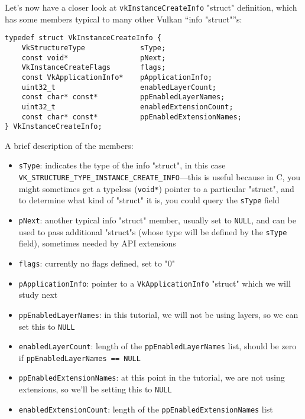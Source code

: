 \documentclass[12pt,letterpaper]{article}
\newcommand{\inquotes}[1]{``#1''}	%
\newcommand{\cil}[1]{\texttt{#1}}
\begin{document}
	Let's now have a closer look at \cil{vkInstanceCreateInfo} "struct" definition, which has some members typical to many other Vulkan \inquotes{info "struct"}s:
		\begin{verbatim}
typedef struct VkInstanceCreateInfo {
	VkStructureType             sType;
	const void*                 pNext;
	VkInstanceCreateFlags       flags;
	const VkApplicationInfo*    pApplicationInfo;
	uint32_t                    enabledLayerCount;
	const char* const*          ppEnabledLayerNames;
	uint32_t                    enabledExtensionCount;
	const char* const*          ppEnabledExtensionNames;
} VkInstanceCreateInfo;
		\end{verbatim}
	A brief description of the members:
		\begin{itemize}
			\item \cil{sType}: indicates the type of the info "struct", in this case \cil{VK_STRUCTURE_TYPE_INSTANCE_CREATE_INFO}---this is useful because in C, you might sometimes get a typeless (\cil{void*}) pointer to a particular "struct", and to determine what kind of "struct" it is, you could query the \cil{sType} field
			
			\item \cil{pNext}: another typical info "struct" member, usually set to \cil{NULL}, and can be used to pass additional "struct"s (whose type will be defined by the \cil{sType} field), sometimes needed by API extensions
			
			\item \cil{flags}: currently no flags defined, set to "0"
			
			\item \cil{pApplicationInfo}: pointer to a \cil{VkApplicationInfo} "struct" which we will study next
			
			\item \cil{ppEnabledLayerNames}: in this tutorial, we will not be using layers, so we can set this to \cil{NULL}
			
			\item \cil{enabledLayerCount}: length of the \cil{ppEnabledLayerNames} list, should be zero if \cil{ppEnabledLayerNames == NULL}
			
			\item \cil{ppEnabledExtensionNames}: at this point in the tutorial, we are not using extensions, so we'll be setting this to \cil{NULL}
			
			\item \cil{enabledExtensionCount}: length of the \cil{ppEnabledExtensionNames} list
		\end{itemize}
\end{document}
